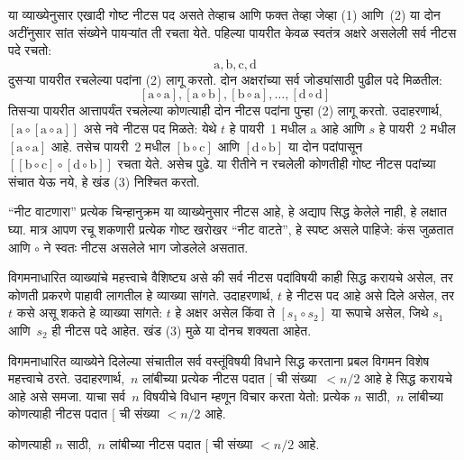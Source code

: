 \documentclass[../../../include/open-logic-section]{subfiles}
\begin{document}
या व्याख्येनुसार एखादी गोष्ट नीटस पद असते तेव्हाच आणि फक्त तेव्हा जेव्हा (1) आणि~(2) या दोन अटींनुसार सांत संख्येने पायऱ्यांत ती रचता येते. पहिल्या पायरीत केवळ स्वतंत्र अक्षरे असलेली सर्व नीटस पदे रचतो:
\[
\mathrm{a}, \mathrm{b}, \mathrm{c}, \mathrm{d}
\]
दुसऱ्या पायरीत रचलेल्या पदांना (2) लागू करतो. दोन अक्षरांच्या सर्व जोड्यांसाठी पुढील पदे मिळतील:
\[
[\mathrm{a} \circ \mathrm{a}], [\mathrm{a} \circ \mathrm{b}],
[\mathrm{b} \circ \mathrm{a}], \dots, [\mathrm{d} \circ \mathrm{d}]
\]
तिसऱ्या पायरीत आत्तापर्यंत रचलेल्या कोणत्याही दोन नीटस पदांना पुन्हा (2) लागू करतो. उदाहरणार्थ, $[\mathrm{a} \circ [\mathrm{a} \circ \mathrm{a}]]$ असे नवे नीटस पद मिळते: येथे $t$ हे पायरी~1 मधील $\mathrm{a}$ आहे आणि $s$ हे पायरी~2 मधील $[\mathrm{a} \circ \mathrm{a}]$ आहे. तसेच पायरी~2 मधील $[\mathrm{b} \circ \mathrm{c}]$ आणि $[\mathrm{d} \circ \mathrm{b}]$ या दोन पदांपासून $[[\mathrm{b} \circ \mathrm{c}] \circ [\mathrm{d} \circ \mathrm{b}]]$ रचता येते. असेच पुढे. या रीतीने न रचलेली कोणतीही गोष्ट नीटस पदांच्या संचात येऊ नये, हे खंड (3) निश्चित करतो.

“नीट वाटणारा” प्रत्येक चिन्हानुक्रम या व्याख्येनुसार नीटस आहे, हे अद्याप सिद्ध केलेले नाही, हे लक्षात घ्या. मात्र आपण रचू शकणारी प्रत्येक गोष्ट खरोखर “नीट वाटते”, हे स्पष्ट असले पाहिजे: कंस जुळतात आणि $\circ$ ने स्वतः नीटस असलेले भाग जोडलेले असतात.

विगमनाधारित व्याख्यांचे महत्त्वाचे वैशिष्ट्य असे की सर्व नीटस पदांविषयी काही सिद्ध करायचे असेल, तर कोणती प्रकरणे पाहावी लागतील हे व्याख्या सांगते. उदाहरणार्थ, $t$ हे नीटस पद आहे असे दिले असेल, तर $t$ कसे असू शकते हे व्याख्या सांगते: $t$ हे अक्षर असेल किंवा ते $[s_1 \circ s_2]$ या रूपाचे असेल, जिथे $s_1$ आणि~$s_2$ ही नीटस पदे आहेत. खंड (3) मुळे या दोनच शक्यता आहेत.

विगमनाधारित व्याख्येने दिलेल्या संचातील सर्व वस्तूंविषयी विधाने सिद्ध करताना प्रबल विगमन विशेष महत्त्वाचे ठरते. उदाहरणार्थ,~$n$ लांबीच्या प्रत्येक नीटस पदात $[$ ची संख्या~$< n/2$ आहे हे सिद्ध करायचे आहे असे समजा. याचा सर्व~$n$ विषयीचे विधान म्हणून विचार करता येतो: प्रत्येक $n$ साठी,~$n$ लांबीच्या कोणत्याही नीटस पदात $[$ ची संख्या $< n/2$ आहे.

\begin{prop}
कोणत्याही $n$ साठी,~$n$ लांबीच्या नीटस पदात $[$ ची संख्या $< n/2$ आहे.
\end{prop}
\end{document}
